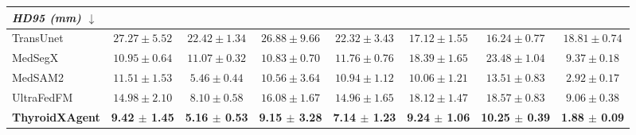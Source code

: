\begin{table}[p]
\begin{threeparttable}
\begin{tabular}{lccccccc}
\midrule
\multicolumn{8}{l}{\textit{HD95 (mm) $\downarrow$}} \\
\midrule
TransUnet~\cite{chen2024transunet}
& $27.27 \pm 5.52$
& $22.42 \pm 1.34$
& $26.88 \pm 9.66$
& $22.32 \pm 3.43$
& $17.12 \pm 1.55$
& $16.24 \pm 0.77$
& $18.81 \pm 0.74$ \\
MedSegX~\cite{zhang2025generalist}
& $10.95 \pm 0.64$
& $11.07 \pm 0.32$
& $10.83 \pm 0.70$
& $11.76 \pm 0.76$
& $18.39 \pm 1.65$
& $23.48 \pm 1.04$
& $9.37 \pm 0.18$ \\
MedSAM2~\cite{ma2025medsam2}
& $11.51 \pm 1.53$
& $5.46 \pm 0.44$
& $10.56 \pm 3.64$
& $10.94 \pm 1.12$
& $10.06 \pm 1.21$
& $13.51 \pm 0.83$
& $2.92 \pm 0.17$ \\
UltraFedFM~\cite{jiang2025pretraining}
& $14.98 \pm 2.10$
& $8.10 \pm 0.58$
& $16.08 \pm 1.67$
& $14.96 \pm 1.65$
& $18.12 \pm 1.47$
& $18.57 \pm 0.83$
& $9.06 \pm 0.38$ \\
\rowcolor{lightgray}
\textbf{ThyroidXAgent}
& \textbf{9.42 $\pm$ 1.45}
& \textbf{5.16 $\pm$ 0.53}
& \textbf{9.15 $\pm$ 3.28}
& \textbf{7.14 $\pm$ 1.23}
& \textbf{9.24 $\pm$ 1.06}
& \textbf{10.25 $\pm$ 0.39}
& \textbf{1.88 $\pm$ 0.09} \\

\bottomrule
\end{tabular}
\end{threeparttable}
\end{table}
